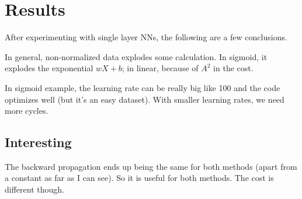 \section{Results}
After experimenting with single layer NNs, the following are a few conclusions.

In general, non-normalized data explodes some calculation.
In sigmoid, it explodes the exponential $wX+b$; in linear, because of $A^2$ in the cost.

In sigmoid example, the learning rate can be really big like 100 and the code optimizes well (but it's an easy dataset). With smaller learning rates, we need more cycles.

\subsection{Interesting}

The backward propagation ends up being the same for both methods (apart from a constant as far as I can see). So it is useful for both methods. The cost is different though.

